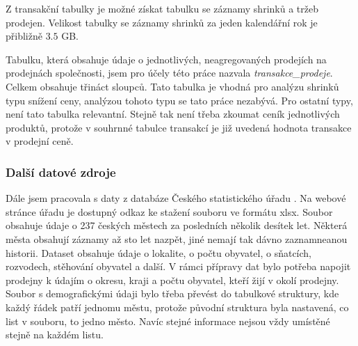 Z transakční tabulky je možné získat tabulku se záznamy shrinků a tržeb prodejen. Velikost tabulky se záznamy shrinků za jeden kalendářní rok je přibližně $3.5$ GB.

Tabulku, která obsahuje údaje o jednotlivých, neagregovaných prodejích na prodejnách společnosti, jsem pro účely této práce nazvala \emph{transakce\_prodeje}. Celkem obsahuje třináct sloupců. Tato tabulka je vhodná pro analýzu shrinků typu snížení ceny, analýzou tohoto typu se tato práce nezabývá. Pro ostatní typy, není tato tabulka relevantní. Stejně tak není třeba zkoumat ceník jednotlivých produktů, protože v souhrnné tabulce transakcí je již uvedená hodnota transakce v prodejní ceně.

\subsubsection{Další datové zdroje}

Dále jsem pracovala s daty z databáze Českého statistického úřadu \cite{bib:czso}. Na webové stránce úřadu je dostupný odkaz ke stažení souboru ve formátu xlsx. Soubor obsahuje údaje o 237 českých městech za posledních několik desítek let. Některá města obsahují záznamy až sto let nazpět, jiné nemají tak dávno zaznamneanou historii. Dataset obsahuje údaje o lokalite, o počtu obyvatel, o sňatcích, rozvodech, stěhování obyvatel a další. V rámci přípravy dat bylo potřeba napojit prodejny k údajím o okresu, kraji a počtu obyvatel, kteří žijí v okolí prodejny. Soubor s demografickými údaji bylo třeba převést do tabulkové struktury, kde každý řádek patří jednomu městu, protože původní struktura byla nastavená, co list v souboru, to jedno město. Navíc stejné informace nejsou vždy umístěné stejně na každém listu. 



% 






